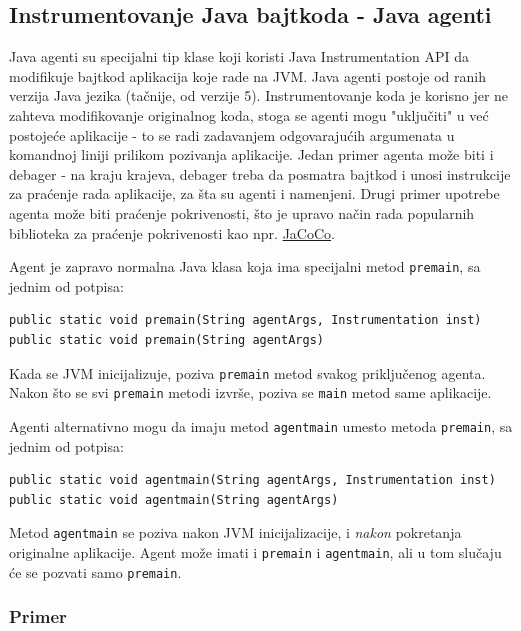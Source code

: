 \subsection{Instrumentovanje Java bajtkoda - Java agenti}\label{instrumentovanje-java-bajtkoda---java-agenti}

Java agenti su specijalni tip klase koji koristi Java Instrumentation API da modifikuje bajtkod aplikacija koje rade na JVM. Java agenti postoje od ranih verzija Java jezika (tačnije, od verzije 5). Instrumentovanje koda je korisno jer ne zahteva modifikovanje originalnog koda, stoga se agenti mogu "uključiti" u već postojeće aplikacije - to se radi zadavanjem odgovarajućih argumenata u komandnoj liniji prilikom pozivanja aplikacije. Jedan primer agenta može biti i debager - na kraju krajeva, debager treba da posmatra bajtkod i unosi instrukcije za praćenje rada aplikacije, za šta su agenti i namenjeni. Drugi primer upotrebe agenta može biti praćenje pokrivenosti, što je upravo način rada popularnih biblioteka za praćenje pokrivenosti kao npr. \href{https://github.com/jacoco/jacoco}{JaCoCo}.

Agent je zapravo normalna Java klasa koja ima specijalni metod \texttt{premain}, sa jednim od potpisa:

\begin{verbatim}
public static void premain(String agentArgs, Instrumentation inst)
public static void premain(String agentArgs)
\end{verbatim}

Kada se JVM inicijalizuje, poziva \texttt{premain} metod svakog priključenog agenta. Nakon što se svi \texttt{premain} metodi izvrše, poziva se \texttt{main} metod same aplikacije.

Agenti alternativno mogu da imaju metod \texttt{agentmain} umesto metoda \texttt{premain}, sa jednim od potpisa:

\begin{verbatim}
public static void agentmain(String agentArgs, Instrumentation inst)
public static void agentmain(String agentArgs)
\end{verbatim}

Metod \texttt{agentmain} se poziva nakon JVM inicijalizacije, i \emph{nakon} pokretanja originalne aplikacije. Agent može imati i \texttt{premain} i \texttt{agentmain}, ali u tom slučaju će se pozvati samo \texttt{premain}.

\subsubsection{Primer}\label{primer}

